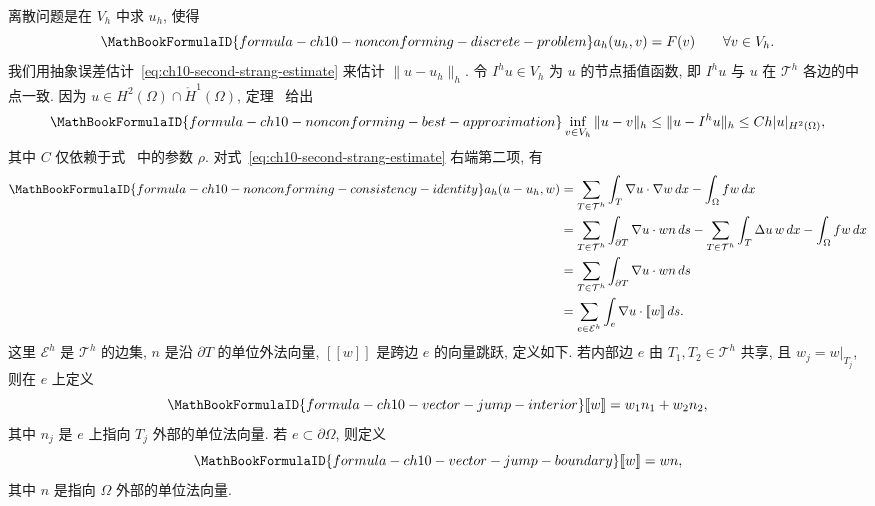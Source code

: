 离散问题是在 $V_h$ 中求 $u_h$, 使得
\begin{equation}
\MathBookFormulaID{formula-ch10-nonconforming-discrete-problem}
\label{eq:ch10-nonconforming-discrete-problem}
a_h(u_h,v)=F(v)\qquad\forall v\in V_h.
\end{equation}
我们用抽象误差估计~\eqref{eq:ch10-second-strang-estimate} 来估计 $\|u-u_h\|_h$. 令 $I^hu\in V_h$ 为 $u$ 的节点插值函数, 即 $I^hu$ 与 $u$ 在 $\mathcal T^h$ 各边的中点一致. 因为 $u\in H^2(\Omega)\cap\mathring H^1(\Omega)$, 定理~ 给出
\begin{equation}
\MathBookFormulaID{formula-ch10-nonconforming-best-approximation}
\label{eq:ch10-nonconforming-best-approximation}
\inf_{v\in V_h}\|u-v\|_h\leq\|u-I^hu\|_h\leq Ch|u|_{H^2(\Omega)},
\end{equation}
其中 $C$ 仅依赖于式~ 中的参数 $\rho$. 对式~\eqref{eq:ch10-second-strang-estimate} 右端第二项, 有
\begin{align}
\MathBookFormulaID{formula-ch10-nonconforming-consistency-identity}
a_h(u-u_h,w)
&=\sum_{T\in\mathcal T^h}\int_T\nabla u\cdot\nabla w\,dx-\int_\Omega fw\,dx\notag\\
&=\sum_{T\in\mathcal T^h}\int_{\partial T}\nabla u\cdot wn\,ds
-\sum_{T\in\mathcal T^h}\int_T\Delta u\,w\,dx-\int_\Omega fw\,dx\notag\\
&=\sum_{T\in\mathcal T^h}\int_{\partial T}\nabla u\cdot wn\,ds\notag\\
&=\sum_{e\in\mathcal E^h}\int_e\nabla u\cdot[\![w]\!]\,ds.
\label{eq:ch10-nonconforming-consistency-identity}
\end{align}
这里 $\mathcal E^h$ 是 $\mathcal T^h$ 的边集, $n$ 是沿 $\partial T$ 的单位外法向量, $[\![w]\!]$ 是跨边 $e$ 的向量跳跃, 定义如下. 若内部边 $e$ 由 $T_1,T_2\in\mathcal T^h$ 共享, 且 $w_j=w|_{T_j}$, 则在 $e$ 上定义
\[
\MathBookFormulaID{formula-ch10-vector-jump-interior}
[\![w]\!]=w_1n_1+w_2n_2,
\]
其中 $n_j$ 是 $e$ 上指向 $T_j$ 外部的单位法向量. 若 $e\subset\partial\Omega$, 则定义
\[
\MathBookFormulaID{formula-ch10-vector-jump-boundary}
[\![w]\!]=wn,
\]
其中 $n$ 是指向 $\Omega$ 外部的单位法向量.

